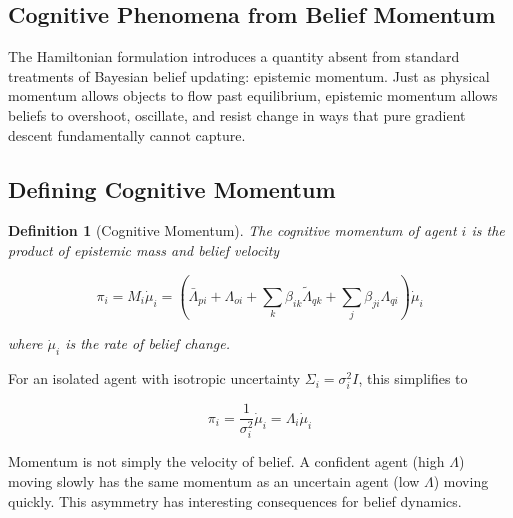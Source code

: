 \documentclass[12pt]{article}
\newtheorem{definition}[theorem]{Definition}
\begin{document}
\subsection{Cognitive Phenomena from Belief Momentum}
\label{sec:cognitive-momentum}

The Hamiltonian formulation introduces a quantity absent from standard treatments of Bayesian belief updating: epistemic momentum. Just as physical momentum allows objects to flow past equilibrium, epistemic momentum allows beliefs to overshoot, oscillate, and resist change in ways that pure gradient descent fundamentally cannot capture. 
\subsection{Defining Cognitive Momentum}



\begin{definition}[Cognitive Momentum]

The cognitive momentum of agent $i$ is the product of epistemic mass and belief velocity

\begin{equation}
\boxed{\pi_i = M_i \dot{\mu}_i = \left(\bar{\Lambda}_{pi} + \Lambda_{oi}+ \sum_k \beta_{ik}\tilde{\Lambda}_{qk} + \sum_j \beta_{ji}\Lambda_{qi}\right) \dot{\mu}_i}
\end{equation}

where $\dot{\mu}_i$ is the rate of belief change.

\end{definition}

For an isolated agent with isotropic uncertainty $\Sigma_i = \sigma_i^2 I$, this simplifies to

\begin{equation}
\pi_i = \frac{1}{\sigma_i^2}\dot{\mu}_i = \Lambda_i \dot{\mu}_i
\end{equation}

 Momentum is not simply the velocity of belief. A confident agent (high $\Lambda$) moving slowly has the same momentum as an uncertain agent (low $\Lambda$) moving quickly. This asymmetry has interesting consequences for belief dynamics.
\end{document}
